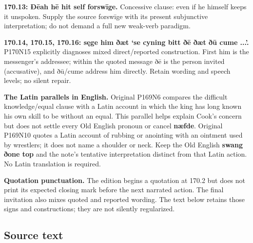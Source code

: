 \textbf{170.13: Ðēah hē hit self forswīge.} Concessive clause: even if he himself keeps it unspoken. Supply the source forswīge with its present subjunctive interpretation; do not demand a full new weak-verb paradigm.

\textbf{170.14, 170.15, 170.16: sęge him ðæt ‘se cyning bitt ðē ðæt ðū cume ...’.} P170N15 explicitly diagnoses mixed direct/\allowbreak{}reported construction. First him is the messenger’s addressee; within the quoted message ðē is the person invited (accusative), and ðū/\allowbreak{}cume address him directly. Retain wording and speech levels; no silent repair.

\textbf{The Latin parallels in English.} Original P169N6 compares the difficult knowledge/\allowbreak{}equal clause with a Latin account in which the king has long known his own skill to be without an equal. This parallel helps explain Cook’s concern but does not settle every Old English pronoun or cancel \textbf{næfde}. Original P169N10 quotes a Latin account of rubbing or anointing with an ointment used by wrestlers; it does not name a shoulder or neck. Keep the Old English \textbf{swang ðone top} and the note’s tentative interpretation distinct from that Latin action. No Latin translation is required.

\textbf{Quotation punctuation.} The edition begins a quotation at 170.2 but does not print its expected closing mark before the next narrated action. The final invitation also mixes quoted and reported wording. The text below retains those signs and constructions; they are not silently regularized.

\subsection*{Source text}



